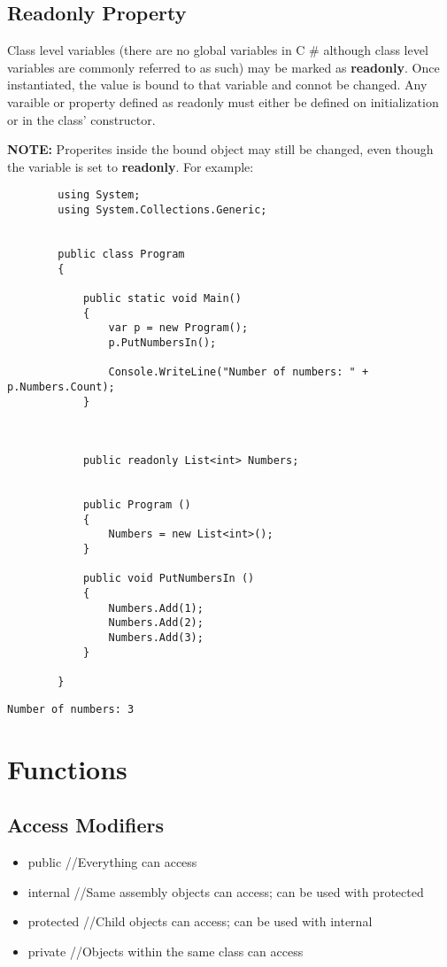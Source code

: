 \documentclass {amsart}
\begin{document}
	\subsection{Readonly Property}  Class level variables (there are no global variables in C \# although class level variables are commonly referred to as such) may be marked as {\bf readonly}.  Once instantiated, the value is bound to that variable and connot be changed.  Any varaible or property defined as readonly must either be defined on initialization or in the class' constructor.
\linebreak

{\bf NOTE:} Properites inside the bound object may still be changed, even though the variable is set to {\bf readonly}.  For example: 

	\begin{lstlisting}
		using System;
		using System.Collections.Generic;

							
		public class Program
		{

			public static void Main()
			{
				var p = new Program();
				p.PutNumbersIn();
				
				Console.WriteLine("Number of numbers: " + p.Numbers.Count);
			}

			
				
			public readonly List<int> Numbers; 


			public Program () 
			{
				Numbers = new List<int>();	
			}

			public void PutNumbersIn () 
			{
				Numbers.Add(1);
				Numbers.Add(2);
				Numbers.Add(3);
			}
			
		}
	\end{lstlisting}

	\begin{verbatim}Number of numbers: 3\end{verbatim}

\section{Functions}
	\subsection{Access Modifiers}
		\begin{itemize}
			\item public 		//Everything can access
			\item internal 	//Same assembly objects can access; can be used with protected
			\item protected	//Child objects can access; can be used with internal
			\item private		//Objects within the same class can access
		\end{itemize}
\end{document}
